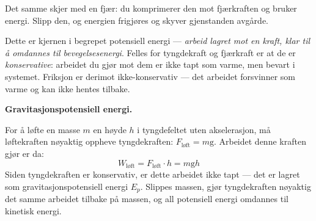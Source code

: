 Det samme skjer med en fjær: du komprimerer den mot fjærkraften og bruker energi. Slipp den, og energien frigjøres og skyver gjenstanden avgårde.

Dette er kjernen i begrepet potensiell energi — \textit{arbeid lagret mot en kraft, klar til å omdannes til bevegelsesenergi}. Felles for tyngdekraft og fjærkraft er at de er \textit{konservative}: arbeidet du gjør mot dem er ikke tapt som varme, men bevart i systemet. Friksjon er derimot ikke-konservativ — det arbeidet forsvinner som varme og kan ikke hentes tilbake.

\newpage
\medskip
\noindent\textbf{Gravitasjonspotensiell energi.}\par\smallskip
\noindent
\begin{minipage}[t]{0.54\linewidth}
\vspace{0pt}
For å løfte en masse $m$ en høyde $h$ i tyngdefeltet uten akselerasjon, må løftekraften nøyaktig oppheve tyngdekraften: $F_\text{løft} = m\mathrm{g}$. Arbeidet denne kraften gjør er da:
\[
W_\text{løft} = F_\text{løft} \cdot h = m\mathrm{g}h
\]
Siden tyngdekraften er konservativ, er dette arbeidet ikke tapt — det er lagret som gravitasjonspotensiell energi $E_p$. Slippes massen, gjør tyngdekraften nøyaktig det samme arbeidet tilbake på massen, og all potensiell energi omdannes til kinetisk energi.
\end{minipage}%
\hfill
